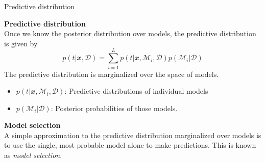 \documentclass{bredelebeamer}
\begin{document}
\begin{frame}{Predictive distribution}
  \begin{justify}
    \textbf{Predictive distribution} \\
    Once we know the posterior distribution over models, the predictive distribution
    is given by
    \begin{equation}
      p(t|\mathbfit{x}, \mathcal{D}) = \sum_{i=1}^{L} p(t|\mathbfit{x}, \mathcal{M}_i, \mathcal{D}) p(\mathcal{M}_i|\mathcal{D})
    \end{equation}
    The predictive distribution is marginalized over the space of models.
    \begin{itemize}
      \item $p(t|\mathbfit{x}, \mathcal{M}_i, \mathcal{D})$: Predictive distributions of individual models
      \item $p(\mathcal{M}_i|\mathcal{D})$: Posterior probabilities of those models.
    \end{itemize}

    \vspace{0.5\baselineskip}
    \textbf{Model selection} \\
    A simple approximation to the predictive distribution marginalized over models
    is to use the single, most probable model alone to make predictions. This is
    known as \textit{model selection}.
  \end{justify}
\end{frame}
\end{document}
